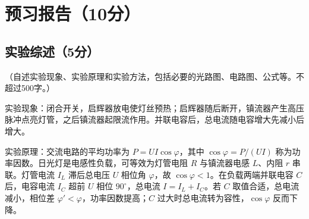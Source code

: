 \documentclass{Preport}
\begin{document}
\setcounter{page}{1}
\makecover

\section{预习报告（10分）}
\subsection{实验综述（5分）}
（自述实验现象、实验原理和实验方法，包括必要的光路图、电路图、公式等。不超过500字。）

实验现象：闭合开关，启辉器放电使灯丝预热；启辉器随后断开，镇流器产生高压脉冲点亮灯管，之后镇流器起限流作用。并联电容后，总电流随电容增大先减小后增大。

实验原理：交流电路的平均功率为 $P=UI\cos\varphi$，其中 $\cos\varphi=P/(UI)$ 称为功率因数。日光灯是电感性负载，可等效为灯管电阻 $R$ 与镇流器电感 $L$、内阻 $r$ 串联。灯管电流 $I_L$ 滞后总电压 $U$ 相位角 $\varphi$，故 $\cos\varphi<1$。在负载两端并联电容 $C$ 后，电容电流 $I_C$ 超前 $U$ 相位 $90^\circ$，总电流 $I=I_L+I_C$。若 $C$ 取值合适，总电流减小，相位差 $\varphi'<\varphi$，功率因数提高；$C$ 过大时总电流转为容性，$\cos\varphi$ 反而下降。
\end{document}
